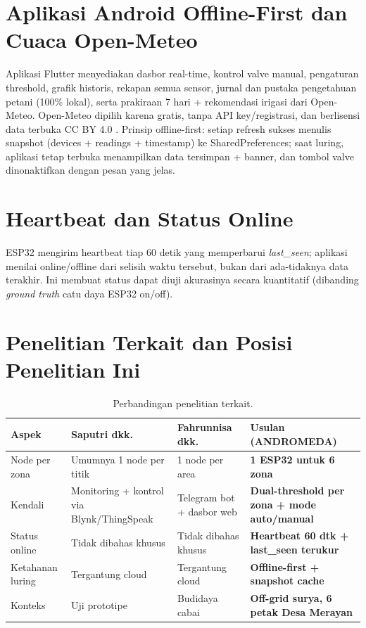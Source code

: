 \documentclass[12pt,a4paper,oneside]{report}
\begin{document}
\section{Aplikasi Android Offline-First dan Cuaca Open-Meteo}
Aplikasi Flutter menyediakan dasbor real-time, kontrol valve manual, pengaturan threshold, grafik historis, rekapan semua sensor, jurnal dan pustaka pengetahuan petani (100\% lokal), serta prakiraan 7 hari + rekomendasi irigasi dari Open-Meteo. Open-Meteo dipilih karena gratis, tanpa API key/registrasi, dan berlisensi data terbuka CC BY 4.0 \cite{openmeteo-docs}. Prinsip offline-first: setiap refresh sukses menulis snapshot (devices + readings + timestamp) ke SharedPreferences; saat luring, aplikasi tetap terbuka menampilkan data tersimpan + banner, dan tombol valve dinonaktifkan dengan pesan yang jelas.

\section{Heartbeat dan Status Online}
ESP32 mengirim heartbeat tiap 60 detik yang memperbarui \textit{last\_seen}; aplikasi menilai online/offline dari selisih waktu tersebut, bukan dari ada-tidaknya data terakhir. Ini membuat status dapat diuji akurasinya secara kuantitatif (dibanding \textit{ground truth} catu daya ESP32 on/off).

\section{Penelitian Terkait dan Posisi Penelitian Ini}
\begin{table}[h]
\centering
\caption{Perbandingan penelitian terkait.}
\begin{tabularx}{\textwidth}{lXXX}
\toprule
Aspek & Saputri dkk. \cite{saputri2025} & Fahrunnisa dkk. \cite{fahrunnisa2026} & Usulan (ANDROMEDA) \\
\midrule
Node per zona & Umumnya 1 node per titik & 1 node per area & \textbf{1 ESP32 untuk 6 zona} \\
Kendali & Monitoring + kontrol via Blynk/ThingSpeak & Telegram bot + dasbor web & \textbf{Dual-threshold per zona + mode auto/manual} \\
Status online & Tidak dibahas khusus & Tidak dibahas khusus & \textbf{Heartbeat 60 dtk + last\_seen terukur} \\
Ketahanan luring & Tergantung cloud & Tergantung cloud & \textbf{Offline-first + snapshot cache} \\
Konteks & Uji prototipe & Budidaya cabai & \textbf{Off-grid surya, 6 petak Desa Merayan} \\
\bottomrule
\end{tabularx}
\end{table}
\end{document}
